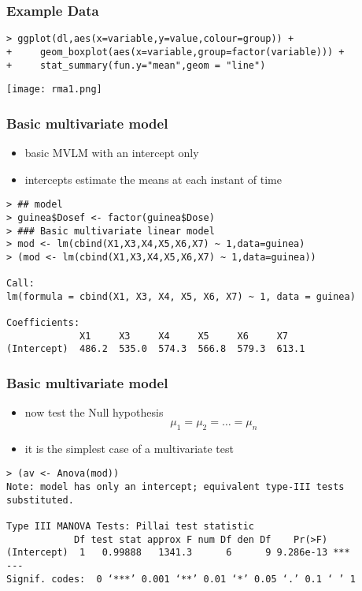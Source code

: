 \begin{frame}[fragile]\frametitle{Example Data}
\scriptsize
\begin{verbatim}
> ggplot(dl,aes(x=variable,y=value,colour=group)) +
+     geom_boxplot(aes(x=variable,group=factor(variable))) +
+     stat_summary(fun.y="mean",geom = "line") 
\end{verbatim}
  \begin{center}
    \texttt{[image: rma1.png]}
  \end{center}
\end{frame}

\begin{frame}[fragile]\frametitle{Basic multivariate model}
  \begin{itemize}
  \item basic MVLM with an intercept only
  \item intercepts estimate the means at each instant of time
  \end{itemize}\scriptsize
\begin{verbatim}
> ## model
> guinea$Dosef <- factor(guinea$Dose)
> ### Basic multivariate linear model
> mod <- lm(cbind(X1,X3,X4,X5,X6,X7) ~ 1,data=guinea)
> (mod <- lm(cbind(X1,X3,X4,X5,X6,X7) ~ 1,data=guinea))

Call:
lm(formula = cbind(X1, X3, X4, X5, X6, X7) ~ 1, data = guinea)

Coefficients:
             X1     X3     X4     X5     X6     X7   
(Intercept)  486.2  535.0  574.3  566.8  579.3  613.1
\end{verbatim}
\end{frame}


\begin{frame}[fragile]\frametitle{Basic multivariate model}
  \begin{itemize}
  \item now test the Null hypothesis $$\mu_1=\mu_2=\ldots =\mu_n$$
  \item it is the simplest case of a multivariate test
  \end{itemize}\scriptsize
\begin{verbatim}
> (av <- Anova(mod))
Note: model has only an intercept; equivalent type-III tests substituted.

Type III MANOVA Tests: Pillai test statistic
            Df test stat approx F num Df den Df    Pr(>F)    
(Intercept)  1   0.99888   1341.3      6      9 9.286e-13 ***
---
Signif. codes:  0 ‘***’ 0.001 ‘**’ 0.01 ‘*’ 0.05 ‘.’ 0.1 ‘ ’ 1
\end{verbatim}
\end{frame}

